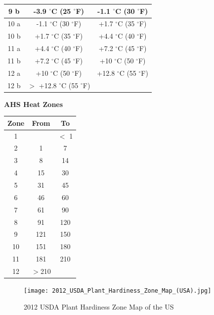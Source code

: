 \documentclass[10pt]{extarticle}
\begin{document}
\begin{center}
\begin{tabular}{|c|c|c|}
\hline 
9 b &	-3.9 $^{\circ}$C (25 $^{\circ}$F) &	-1.1 $^{\circ}$C (30 $^{\circ}$F)
\\
\hline 
10 a &	-1.1 $^{\circ}$C (30 $^{\circ}$F) &	+1.7 $^{\circ}$C (35 $^{\circ}$F)
\\
\hline 
10 b &	+1.7 $^{\circ}$C (35 $^{\circ}$F) &	+4.4 $^{\circ}$C (40 $^{\circ}$F)
\\
\hline 
11 a &	+4.4 $^{\circ}$C (40 $^{\circ}$F) &	+7.2 $^{\circ}$C (45 $^{\circ}$F)
\\
\hline 
11 b &	+7.2 $^{\circ}$C (45 $^{\circ}$F) &	+10 $^{\circ}$C (50 $^{\circ}$F)
\\
\hline 
12 a &	+10 $^{\circ}$C (50 $^{\circ}$F) & +12.8 $^{\circ}$C (55 $^{\circ}$F)
\\
\hline 
12 b &  $>$ +12.8 $^{\circ}$C (55 $^{\circ}$F)  & \\
\hline 
\end{tabular}
\end{center}
\begin{center}
\textbf{AHS Heat Zones} \\
\begin{tabular}{|c|c|c|}
	\hline
	Zone &	From &	To
\\
	\hline
	1 && $<$ 1
\\
	\hline
	2 &	1 &	7
\\
	\hline
	3 &	8 &	14
\\
	\hline
	4 &	15 & 30
\\
	\hline
	5 &	31 & 45
\\
	\hline
	6 &	46 & 60
\\
	\hline
	7 &	61 & 90
\\
	\hline
	8 &	91 & 120
\\
	\hline
	9 &	121 & 150 \\
	\hline
	10 & 151 & 180
\\
	\hline
	11 & 181 & 210
\\
	\hline
	12 & $>$210 & \\
	\hline
\end{tabular}
\end{center}

\begin{figure}
	\texttt{[image: 2012\_USDA\_Plant\_Hardiness\_Zone\_Map\_(USA).jpg]}
	\caption{2012 USDA Plant Hardiness Zone Map of the US}
	\label{fig:PlantHardinessZoneMapoftheUS}
\end{figure}
\end{document}
